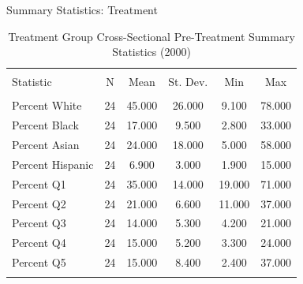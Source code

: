 \documentclass[11pt,ignorenonframetext,]{beamer}
\begin{document}
\begin{frame}{Summary Statistics: Treatment}
\protect\hypertarget{summary-statistics-treatment}{}

\begin{table}[!htbp] \centering 
  \caption{Treatment Group Cross-Sectional Pre-Treatment Summary Statistics (2000)} 
  \label{} 
\begin{tabular}{@{\extracolsep{5pt}}lccccc} 
\\[-1.8ex]\hline 
\hline \\[-1.8ex] 
Statistic & \multicolumn{1}{c}{N} & \multicolumn{1}{c}{Mean} & \multicolumn{1}{c}{St. Dev.} & \multicolumn{1}{c}{Min} & \multicolumn{1}{c}{Max} \\ 
\hline \\[-1.8ex] 
Percent White & 24 & 45.000 & 26.000 & 9.100 & 78.000 \\ 
Percent Black & 24 & 17.000 & 9.500 & 2.800 & 33.000 \\ 
Percent Asian & 24 & 24.000 & 18.000 & 5.000 & 58.000 \\ 
Percent Hispanic & 24 & 6.900 & 3.000 & 1.900 & 15.000 \\ 
Percent Q1 & 24 & 35.000 & 14.000 & 19.000 & 71.000 \\ 
Percent Q2 & 24 & 21.000 & 6.600 & 11.000 & 37.000 \\ 
Percent Q3 & 24 & 14.000 & 5.300 & 4.200 & 21.000 \\ 
Percent Q4 & 24 & 15.000 & 5.200 & 3.300 & 24.000 \\ 
Percent Q5 & 24 & 15.000 & 8.400 & 2.400 & 37.000 \\ 
\hline \\[-1.8ex] 
\end{tabular} 
\end{table}

\end{frame}
\end{document}
